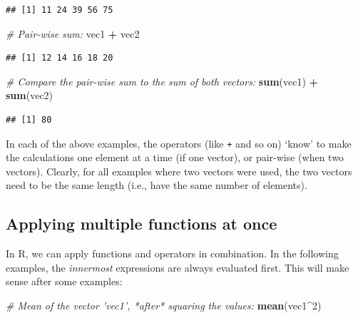 \documentclass[]{book}
\newenvironment{Shaded}{\begin{snugshade}}{\end{snugshade}}
\newcommand{\CommentTok}[1]{\textcolor[rgb]{0.56,0.35,0.01}{\textit{#1}}}
\newcommand{\DecValTok}[1]{\textcolor[rgb]{0.00,0.00,0.81}{#1}}
\newcommand{\KeywordTok}[1]{\textcolor[rgb]{0.13,0.29,0.53}{\textbf{#1}}}
\newcommand{\NormalTok}[1]{#1}
\newcommand{\OperatorTok}[1]{\textcolor[rgb]{0.81,0.36,0.00}{\textbf{#1}}}
\newcommand{\StringTok}[1]{\textcolor[rgb]{0.31,0.60,0.02}{#1}}
\begin{document}
\begin{verbatim}
## [1] 11 24 39 56 75
\end{verbatim}

\begin{Shaded}
\begin{Highlighting}[]
\CommentTok{# Pair-wise sum:}
\NormalTok{vec1 }\OperatorTok{+}\StringTok{ }\NormalTok{vec2}
\end{Highlighting}
\end{Shaded}

\begin{verbatim}
## [1] 12 14 16 18 20
\end{verbatim}

\begin{Shaded}
\begin{Highlighting}[]
\CommentTok{# Compare the pair-wise sum to the sum of both vectors:}
\KeywordTok{sum}\NormalTok{(vec1) }\OperatorTok{+}\StringTok{ }\KeywordTok{sum}\NormalTok{(vec2)}
\end{Highlighting}
\end{Shaded}

\begin{verbatim}
## [1] 80
\end{verbatim}

In each of the above examples, the operators (like \texttt{+} and so on) `know' to make the calculations one element at a time (if one vector), or pair-wise (when two vectors). Clearly, for all examples where two vectors were used, the two vectors need to be the same length (i.e., have the same number of elements).

\hypertarget{multifunctions}{%
\subsection{Applying multiple functions at once}\label{multifunctions}}

In R, we can apply functions and operators in combination. In the following examples, the \emph{innermost} expressions are always evaluated first. This will make sense after some examples:

\begin{Shaded}
\begin{Highlighting}[]
\CommentTok{# Mean of the vector 'vec1', *after* squaring the values:}
\KeywordTok{mean}\NormalTok{(vec1}\OperatorTok{^}\DecValTok{2}\NormalTok{)}
\end{Highlighting}
\end{Shaded}
\end{document}
